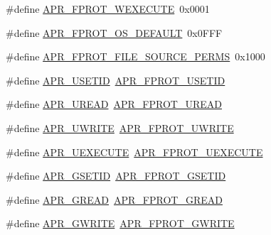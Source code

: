 \begin{DoxyCompactItemize}
\item 
\#define \hyperlink{group__apr__file__permissions_ga760d69c09b38ddf1e0aff09362d8ce11}{A\-P\-R\-\_\-\-F\-P\-R\-O\-T\-\_\-\-W\-E\-X\-E\-C\-U\-T\-E}~0x0001
\item 
\#define \hyperlink{group__apr__file__permissions_gad3c65a67ee6eb12ecc6a33857397900b}{A\-P\-R\-\_\-\-F\-P\-R\-O\-T\-\_\-\-O\-S\-\_\-\-D\-E\-F\-A\-U\-L\-T}~0x0\-F\-F\-F
\item 
\#define \hyperlink{group__apr__file__permissions_gac08d4e868c7c9532f7c97c70556663dc}{A\-P\-R\-\_\-\-F\-P\-R\-O\-T\-\_\-\-F\-I\-L\-E\-\_\-\-S\-O\-U\-R\-C\-E\-\_\-\-P\-E\-R\-M\-S}~0x1000
\item 
\#define \hyperlink{group__apr__file__permissions_gafae6b531c08999345536cae5654d0d03}{A\-P\-R\-\_\-\-U\-S\-E\-T\-I\-D}~\hyperlink{group__apr__file__permissions_ga67caebf5bbe4f3f4b6252a75e5ce066f}{A\-P\-R\-\_\-\-F\-P\-R\-O\-T\-\_\-\-U\-S\-E\-T\-I\-D}
\item 
\#define \hyperlink{group__apr__file__permissions_ga51dc87ecd94c98e97694e68d5d9620a0}{A\-P\-R\-\_\-\-U\-R\-E\-A\-D}~\hyperlink{group__apr__file__permissions_gaab6c4c2e7b95f4345c248c27b3f1a655}{A\-P\-R\-\_\-\-F\-P\-R\-O\-T\-\_\-\-U\-R\-E\-A\-D}
\item 
\#define \hyperlink{group__apr__file__permissions_ga4faa7fdfa3bcda569dd1e23ae002c5e5}{A\-P\-R\-\_\-\-U\-W\-R\-I\-T\-E}~\hyperlink{group__apr__file__permissions_ga50b985779b15fbfdae0758e98ffb92af}{A\-P\-R\-\_\-\-F\-P\-R\-O\-T\-\_\-\-U\-W\-R\-I\-T\-E}
\item 
\#define \hyperlink{group__apr__file__permissions_ga4c08d7e798ab4022e31ed70f06f202b5}{A\-P\-R\-\_\-\-U\-E\-X\-E\-C\-U\-T\-E}~\hyperlink{group__apr__file__permissions_ga156e1374a4ef30e745340d8c20b36d03}{A\-P\-R\-\_\-\-F\-P\-R\-O\-T\-\_\-\-U\-E\-X\-E\-C\-U\-T\-E}
\item 
\#define \hyperlink{group__apr__file__permissions_ga4e4e9bb05f2bb156b174461551c9c329}{A\-P\-R\-\_\-\-G\-S\-E\-T\-I\-D}~\hyperlink{group__apr__file__permissions_ga5fcf6746afdd4e9b8be6ceab6892a3f5}{A\-P\-R\-\_\-\-F\-P\-R\-O\-T\-\_\-\-G\-S\-E\-T\-I\-D}
\item 
\#define \hyperlink{group__apr__file__permissions_ga1bd0305f31cb3bb20a8f9db898b96eb1}{A\-P\-R\-\_\-\-G\-R\-E\-A\-D}~\hyperlink{group__apr__file__permissions_ga5ad9b67b8008db3ffc56c3c2a65aa192}{A\-P\-R\-\_\-\-F\-P\-R\-O\-T\-\_\-\-G\-R\-E\-A\-D}
\item 
\#define \hyperlink{group__apr__file__permissions_ga794c425b459aa46939f6febabbe9daef}{A\-P\-R\-\_\-\-G\-W\-R\-I\-T\-E}~\hyperlink{group__apr__file__permissions_gacecdc9f88b04c768150418688b786500}{A\-P\-R\-\_\-\-F\-P\-R\-O\-T\-\_\-\-G\-W\-R\-I\-T\-E}

\end{DoxyCompactItemize}
